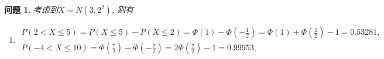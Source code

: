 \documentclass[a4paper]{article}
\theoremstyle{mystyle}
\newtheorem{prob}{问题}[section]
\begin{document}
	\setcounter{prob}{25}
	\begin{prob}
		考虑到$X\sim N(3,2^2)$, 则有
		\begin{enumerate}[{(}1{)}]
			\item
			\begin{gather*}
				P(2<X\leqslant 5)=P(X\leqslant 5)-P(X\leqslant 2)=\varPhi(1)-\varPhi\left(-\frac{1}{2}\right)=\varPhi(1)+\varPhi\left(\frac{1}{2}\right)-1=0.53281,\\
				P(-4<X\leqslant 10)=\varPhi\left(\frac{7}{2}\right)-\varPhi\left(-\frac{7}{2}\right)=2\varPhi\left(\frac{7}{2}\right)-1=0.99953,
			\end{gather*}
		\end{enumerate}
	\end{prob}
\end{document}
